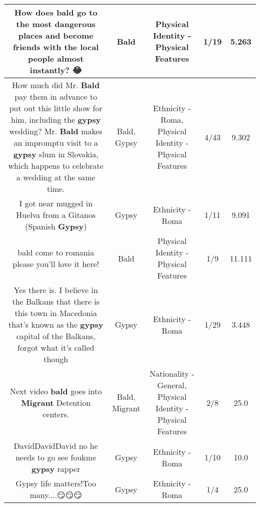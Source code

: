 \documentclass[11pt]{article}
\newlength\mylength
\begin{document}
\begin{center}
\begin{longtable}{|C{.65\mylength}|C{.30\mylength}|C{.12\mylength}|C{.12\mylength}|C{.12\mylength}|}
  \small How does \textbf{bald} go to the most dangerous places and become friends with the local people almost instantly? 😂\normalsize   & Bald & Physical Identity - Physical Features & 1/19 & 5.263 \\  \hline
  \small How  much did Mr. \textbf{Bald} pay them in advance to put out this little show for him, including the \textbf{gypsy} wedding? Mr. \textbf{Bald} makes an impromptu visit to a \textbf{gypsy} slum in Slovakia, which happens to celebrate a wedding at the same time.\normalsize   & Bald, Gypsy & Ethnicity - Roma, Physical Identity - Physical Features & 4/43 & 9.302 \\  \hline
  \small I got near mugged in Huelva from a Gitanos (Spanish \textbf{Gypsy})\normalsize   & Gypsy & Ethnicity - Roma & 1/11 & 9.091 \\  \hline
  \small bald come to romania please you'll love it here!\normalsize   & Bald & Physical Identity - Physical Features & 1/9 & 11.111 \\  \hline
  \small Yes there is. I believe in the Balkans that there is this town in Macedonia that's known as the \textbf{gypsy} capital of the Balkans, forgot what it's called though\normalsize   & Gypsy & Ethnicity - Roma & 1/29 & 3.448 \\  \hline
  \small Next video \textbf{bald} goes into \textbf{Migrant} Detention centers.\normalsize   & Bald, Migrant & Nationality - General, Physical Identity - Physical Features & 2/8 & 25.0 \\  \hline
  \small DavidDavidDavid no he needs to go see foukme \textbf{gypsy} rapper\normalsize   & Gypsy & Ethnicity - Roma & 1/10 & 10.0 \\  \hline
  \small Gypsy life matters!Too many....😏😏😏\normalsize   & Gypsy & Ethnicity - Roma & 1/4 & 25.0 \\  \hline

\end{longtable}
\end{center}
\end{document}
